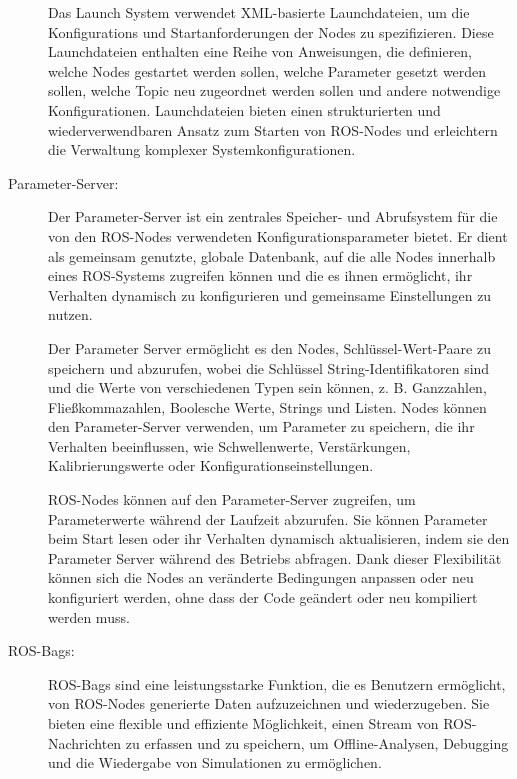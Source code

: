 \begin{description}
    Das Launch System verwendet XML-basierte Launchdateien, um die Konfigurations und Startanforderungen der Nodes zu spezifizieren. Diese Launchdateien enthalten eine Reihe von Anweisungen, die definieren, welche Nodes gestartet werden sollen, welche Parameter gesetzt werden sollen, welche Topic neu zugeordnet werden sollen und andere notwendige Konfigurationen. Launchdateien bieten einen strukturierten und wiederverwendbaren Ansatz zum Starten von ROS-Nodes und erleichtern die Verwaltung komplexer Systemkonfigurationen.

    \cite[vgl.][]{roslaunch}
    
    \item[Parameter-Server:] Der Parameter-Server ist ein zentrales Speicher- und Abrufsystem für die von den ROS-Nodes verwendeten Konfigurationsparameter bietet. Er dient als gemeinsam genutzte, globale Datenbank, auf die alle Nodes innerhalb eines \ac{ROS}-Systems zugreifen können und die es ihnen ermöglicht, ihr Verhalten dynamisch zu konfigurieren und gemeinsame Einstellungen zu nutzen.

    Der Parameter Server ermöglicht es den Nodes, Schlüssel-Wert-Paare zu speichern und abzurufen, wobei die Schlüssel String-Identifikatoren sind und die Werte von verschiedenen Typen sein können, z. B. Ganzzahlen, Fließkommazahlen, Boolesche Werte, Strings und Listen. Nodes können den Parameter-Server verwenden, um Parameter zu speichern, die ihr Verhalten beeinflussen, wie Schwellenwerte, Verstärkungen, Kalibrierungswerte oder Konfigurationseinstellungen.
    
    ROS-Nodes können auf den Parameter-Server zugreifen, um Parameterwerte während der Laufzeit abzurufen. Sie können Parameter beim Start lesen oder ihr Verhalten dynamisch aktualisieren, indem sie den Parameter Server während des Betriebs abfragen. Dank dieser Flexibilität können sich die Nodes an veränderte Bedingungen anpassen oder neu konfiguriert werden, ohne dass der Code geändert oder neu kompiliert werden muss.

    \cite[vgl.][]{parameter-server}
    
    
    \item[ROS-Bags:] ROS-Bags sind eine leistungsstarke Funktion, die es Benutzern ermöglicht, von ROS-Nodes generierte Daten aufzuzeichnen und wiederzugeben. Sie bieten eine flexible und effiziente Möglichkeit, einen Stream von \ac{ROS}-Nachrichten zu erfassen und zu speichern, um Offline-Analysen, Debugging und die Wiedergabe von Simulationen zu ermöglichen.


\end{description}
